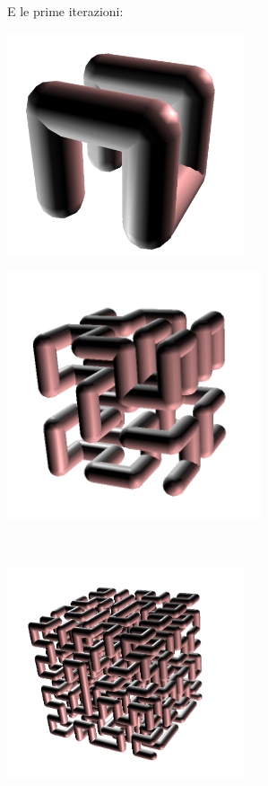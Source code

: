 E le prime iterazioni:
\begin{center}
	\begin{minipage}{7cm}
		\includegraphics[width=7cm]{pics/linden-hilbert1.png}
	\end{minipage}
	\begin{minipage}{7cm}
		\includegraphics[width=7.5cm]{pics/linden-hilbert2.png}
	\end{minipage}\\
	\begin{minipage}{7cm}
		\includegraphics[width=7cm]{pics/linden-hilbert3.png}
	\end{minipage}
	\begin{minipage}{7cm}

\end{minipage}
\end{center}

